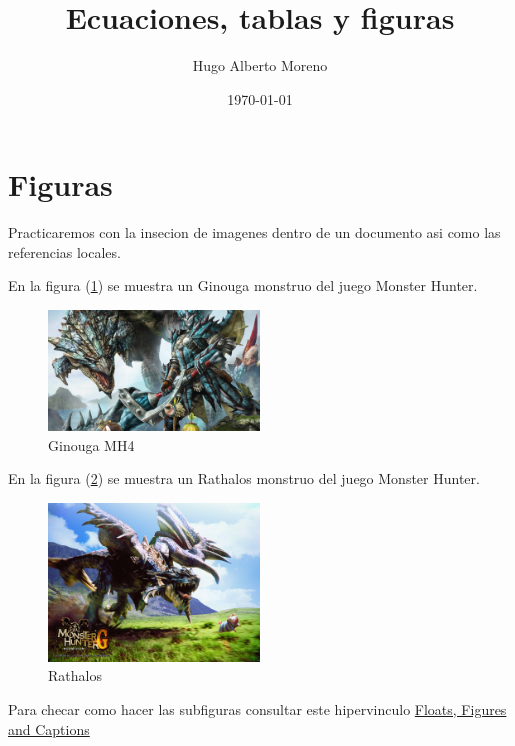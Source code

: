 \documentclass[twocolumn]{article}
\title{\sc Ecuaciones, tablas y figuras}
\author{Hugo Alberto Moreno}
\date{\today}
\begin{document}
\thispagestyle{empty}
\maketitle	

\section{Figuras}
\label{sec:figuras}

Practicaremos con la insecion de imagenes dentro de un documento asi como las referencias locales.

\blindtext

\vspace{1cm}
En la figura (\ref{fig:1}) se muestra un Ginouga monstruo del juego Monster Hunter.

\begin{figure}[h!]
	\centering
	\includegraphics[width=0.5\textwidth]{mh1}
	\caption{Ginouga MH4}
	\label{fig:1}
\end{figure}

En la figura (\ref{fig:2}) %
se muestra un Rathalos monstruo del juego Monster Hunter.

\begin{figure}[h!]
	\centering
	\includegraphics[width=0.5\textwidth]{mh2}
	\caption{Rathalos}
	\label{fig:2}
\end{figure}

Para checar como hacer las subfiguras consultar este hipervinculo \href{https://en.wikibooks.org/wiki/LaTeX/Floats,_Figures_and_Captions}{Floats, Figures and Captions}
\end{document}
